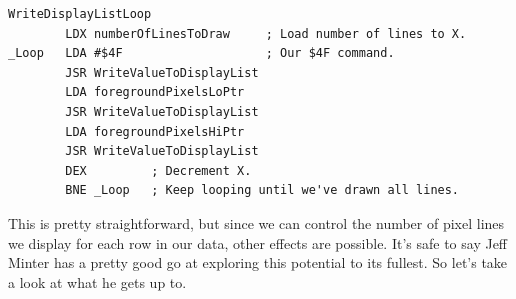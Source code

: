 \begin{lstlisting}
WriteDisplayListLoop   
        LDX numberOfLinesToDraw     ; Load number of lines to X.
_Loop   LDA #$4F                    ; Our $4F command.
        JSR WriteValueToDisplayList
        LDA foregroundPixelsLoPtr
        JSR WriteValueToDisplayList
        LDA foregroundPixelsHiPtr
        JSR WriteValueToDisplayList
        DEX         ; Decrement X.
        BNE _Loop   ; Keep looping until we've drawn all lines.
\end{lstlisting}

This is pretty straightforward, but since we can control the number of pixel lines we display for each row in our
data, other effects are possible. It's safe to say Jeff Minter has a pretty good go at exploring this potential
to its fullest. So let's take a look at what he gets up to.

%
%
